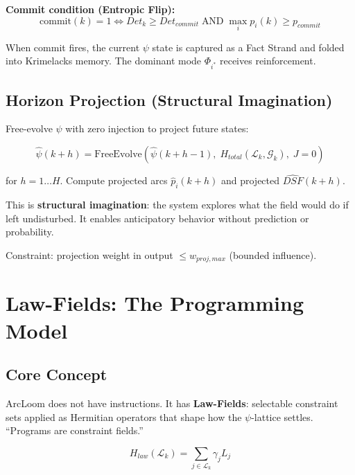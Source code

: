 \documentclass[11pt, a4paper]{report}
\begin{document}
\textbf{Commit condition (Entropic Flip):}
\begin{equation}
  \text{commit}(k) = 1 \iff Det_k \geq Det_{commit} \;\text{AND}\; \max_i p_i(k) \geq p_{commit}
\end{equation}

When commit fires, the current $\psi$ state is captured as a Fact Strand
and folded into Krimelacks memory. The dominant mode $\Phi_{i^*}$ receives
reinforcement.

\section{Horizon Projection (Structural Imagination)}

Free-evolve $\psi$ with zero injection to project future states:

\begin{equation}
  \hat{\psi}(k+h) = \text{FreeEvolve}\!\left( \hat{\psi}(k+h-1),\; H_{total}(\mathcal{L}_k, \mathcal{G}_k),\; J=0 \right)
\end{equation}

for $h = 1 \ldots H$. Compute projected arcs $\hat{p}_i(k+h)$ and
projected $\widehat{DSF}(k+h)$.

This is \textbf{structural imagination}: the system explores what the
field would do if left undisturbed. It enables anticipatory behavior
without prediction or probability.

Constraint: projection weight in output $\leq w_{proj,max}$ (bounded
influence).

\chapter{Law-Fields: The Programming Model}

\section{Core Concept}

ArcLoom does not have instructions. It has \textbf{Law-Fields}: selectable
constraint sets applied as Hermitian operators that shape how the
$\psi$-lattice settles. ``Programs are constraint fields.''

\begin{equation}
  H_{law}(\mathcal{L}_k) = \sum_{j \in \mathcal{L}_k} \gamma_j L_j
\end{equation}
\end{document}
